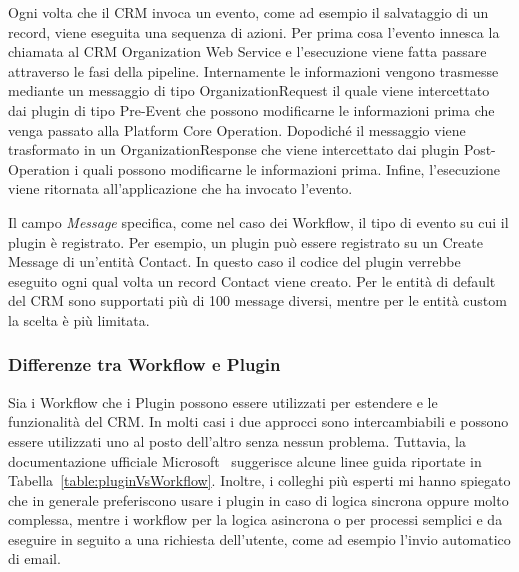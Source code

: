 Ogni volta che il CRM invoca un evento, come ad esempio il salvataggio di un record, viene eseguita una sequenza di azioni.
Per prima cosa l'evento innesca la chiamata al CRM Organization Web Service e l'esecuzione viene fatta passare attraverso le fasi della pipeline. Internamente le informazioni vengono trasmesse mediante un messaggio di tipo OrganizationRequest il quale viene intercettato dai plugin di tipo Pre-Event che possono modificarne le informazioni prima che venga passato alla Platform Core Operation. Dopodiché il messaggio viene trasformato in un OrganizationResponse che viene intercettato dai plugin Post-Operation i quali possono modificarne le informazioni prima.
Infine, l'esecuzione viene ritornata all'applicazione che ha invocato l'evento.

Il campo \textit{Message} specifica, come nel caso dei Workflow, il tipo di evento su cui il plugin è registrato. Per esempio, un plugin può essere registrato su un Create Message di un'entità Contact. In questo caso il codice del plugin verrebbe eseguito ogni qual volta un record Contact viene creato. Per le entità di default del CRM sono supportati più di 100 message diversi, mentre per le entità custom la scelta è più limitata.~\cite{DynamicsTutorialspoint}

\subsubsection{Differenze tra Workflow e Plugin}
Sia i Workflow che i Plugin possono essere utilizzati per estendere e le funzionalità del CRM. In molti casi i due approcci sono intercambiabili e possono essere utilizzati uno al posto dell'altro senza nessun problema. 
Tuttavia, la documentazione ufficiale Microsoft~\cite{PluginVSWorkflow} suggerisce alcune linee guida riportate in Tabella~\ref{table:pluginVsWorkflow}. Inoltre, i colleghi più esperti mi hanno spiegato che in generale preferiscono usare i plugin in caso di logica sincrona oppure molto complessa, mentre i workflow per la logica asincrona o per processi semplici e da eseguire in seguito a una richiesta dell'utente, come ad esempio l'invio automatico di email.

